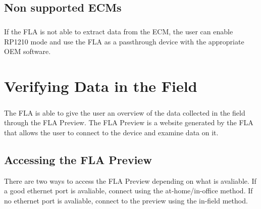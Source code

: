 \documentclass[11pt, oneside]{book}
\begin{document}
\section{Non supported ECMs}
\paragraph{  }
If the FLA is not able to extract data from the ECM, the user can enable RP1210 mode and use the FLA as a passthrough device with the appropriate OEM software.

\chapter{Verifying Data in the Field}
\paragraph{  }
The FLA is able to give the user an overview of the data collected in the field through the FLA Preview. The FLA Preview is a website generated by the FLA that allows the user to connect to the device and examine data on it.
\section{Accessing the FLA Preview}
There are two ways to access the FLA Preview depending on what is avaliable. If a good ethernet port is avaliable, connect using the at-home/in-office method. If no ethernet port is avaliable, connect to the preview using the in-field method.
\paragraph{  }
\end{document}
